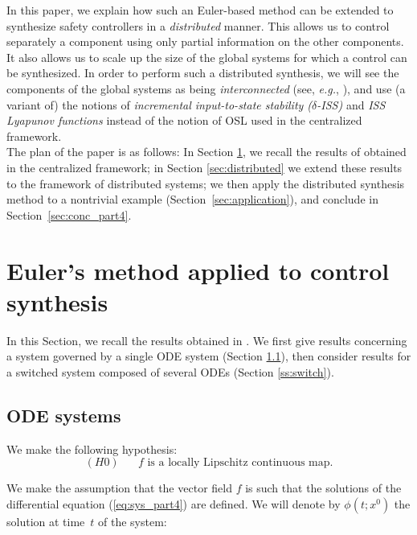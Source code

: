 In this paper, we explain how such an Euler-based method can be extended to
synthesize safety controllers in a {\em distributed} manner. This allows us
to control separately a component using only partial information on the other
components. It also allows us to scale up the size of the global systems for
which a control can be synthesized. In order to perform such a distributed
synthesis, we will see the components of the global systems as being {\em interconnected}
(see, \textit{e.g.}, \cite{yang2015lyapunov}),
and use (a variant of) the notions of {\em incremental input-to-state stability ($\delta$-ISS)}
and {\em ISS Lyapunov functions}
\cite{jiang1996lyapunov}
instead of the notion of OSL used in the centralized framework.\\


The plan of the paper is as follows: In Section \ref{sec:background}, we recall the
results of \cite{SNR17} obtained in the centralized framework; in Section \ref{sec:distributed}
we extend these results to the framework of distributed systems;
we then apply the distributed synthesis method to a nontrivial example
(Section~\ref{sec:application}), and conclude in Section~\ref{sec:conc_part4}.


\section{Euler's method applied to control synthesis}\label{sec:background}
In this Section, we recall the results obtained in \cite{SNR17}.
We first give results concerning a system governed by a single ODE system
(Section \ref{ss:ODE}), then consider results for a switched system composed
of several ODEs (Section \ref{ss:switch}).
\subsection{ODE systems}\label{ss:ODE}
We make the following hypothesis:
%
$$(H0)\quad
\mbox{ $f$ is a locally Lipschitz continuous map}.$$

We make the assumption that the vector field $f$ is such that the
solutions of the differential equation  (\ref{eq:sys_part4}) are defined. %
We will denote by $\phi(t; x^0)$ the
solution at time~$t$ of the system:

